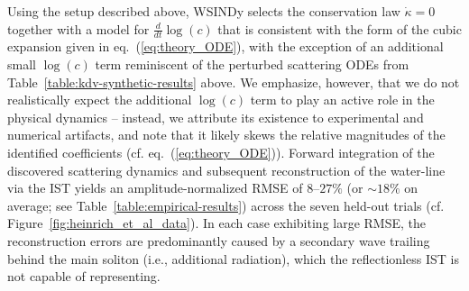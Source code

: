 \documentclass[journal=gmj]{CUP-JNL-DTM}%
\theoremstyle{definition}
\numberwithin{equation}{section}
\begin{document}
Using the setup described above, WSINDy selects the conservation law $\dot{\kappa} = 0$ together with a model for $\tfrac{d}{dt}\log(c)$ that is consistent with the form of the cubic expansion given in eq.~(\ref{eq:theory_ODE}), with the exception of an additional small $\log(c)$ term reminiscent of the perturbed scattering ODEs from Table~\ref{table:kdv-synthetic-results} above. We emphasize, however, that we do not realistically expect the additional $\log(c)$ term to play an active role in the physical dynamics -- instead, we attribute its existence to experimental and numerical artifacts, and note that it likely skews the relative magnitudes of the identified coefficients (cf. eq.~(\ref{eq:theory_ODE})). Forward integration of the discovered scattering dynamics and subsequent reconstruction of the water-line via the IST yields an amplitude-normalized RMSE of $8$--$27\%$ (or $\sim\!18\%$ on average; see Table~\ref{table:empirical-results}) across the seven held-out trials (cf. Figure~\ref{fig:heinrich_et_al_data}). In each case exhibiting large RMSE, the reconstruction errors are predominantly caused by a secondary wave trailing behind the main soliton (i.e., additional radiation), which the reflectionless IST is not capable of representing.

\vspace{-2 mm}
\end{document}
